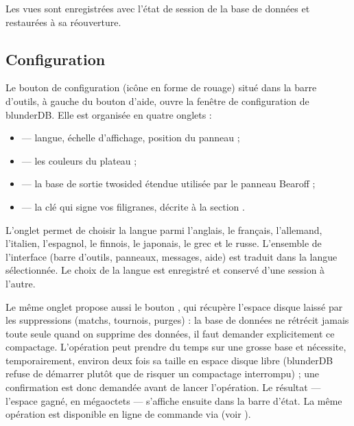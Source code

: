 \documentclass[letterpaper,10pt,french]{sphinxmanual}
\begin{document}
\sphinxAtStartPar
Les vues sont enregistrées avec l’état de session de la base de données et
restaurées à sa réouverture.


\subsection{Configuration}
\label{\detokenize{manuel:configuration}}\label{\detokenize{manuel:id2}}
\sphinxAtStartPar
Le bouton de configuration (icône en forme de rouage) situé dans la barre
d’outils, à gauche du bouton d’aide, ouvre la fenêtre de configuration de
blunderDB. Elle est organisée en quatre onglets :
\begin{itemize}
\item {} 
\sphinxAtStartPar
{} — langue, échelle d’affichage, position du panneau ;

\item {} 
\sphinxAtStartPar
{} — les couleurs du plateau ;

\item {} 
\sphinxAtStartPar
{} — la base de sortie two\sphinxhyphen{}sided étendue utilisée par le panneau
Bearoff ;

\item {} 
\sphinxAtStartPar
{} — la clé qui signe vos filigranes, décrite à la
section {\hyperref[\detokenize{manuel:diffusion-controlee}]{}}.

\end{itemize}

\sphinxAtStartPar
L’onglet  permet de choisir la langue parmi l’anglais, le
français, l’allemand, l’italien, l’espagnol, le finnois, le japonais, le grec
et le russe. L’ensemble de l’interface (barre d’outils, panneaux, messages,
aide) est traduit dans la langue sélectionnée. Le choix de la langue est
enregistré et conservé d’une session à l’autre.

\sphinxAtStartPar
Le même onglet propose aussi le bouton , qui récupère
l’espace disque laissé par les suppressions (matchs, tournois, purges) : la
base de données ne rétrécit jamais toute seule quand on supprime des données,
il faut demander explicitement ce compactage. L’opération peut prendre du
temps sur une grosse base et nécessite, temporairement, environ deux fois sa
taille en espace disque libre (blunderDB refuse de démarrer plutôt que de
risquer un compactage interrompu) ; une confirmation est donc demandée avant
de lancer l’opération. Le résultat — l’espace gagné, en mégaoctets — s’affiche
ensuite dans la barre d’état. La même opération est disponible en ligne de
commande via  (voir {\hyperref[\detokenize{cli:cli}]{}}).
\end{document}
